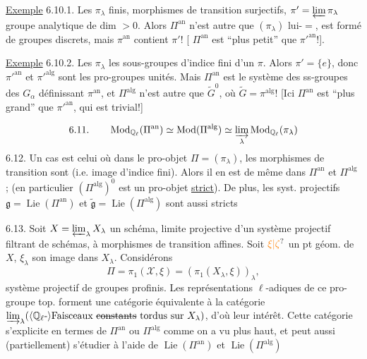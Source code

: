 \uline{Exemple} 6.10.1. Les $\pi_\lambda$ finis, morphismes de transition surjectifs, $\pi'=\varprojlim\pi_\lambda$ groupe analytique de dim $>0$. Alors $\Pi^{\mathrm{an}}$ n'est autre que $(\pi_\lambda)$ lui-$=$, est formé de groupes discrets, mais $\pi^{\mathrm{an}}$ contient  $\pi'$! [ $\Pi^{\mathrm{an}}$  est ``plus petit'' que $\pi'^{\mathrm{an}}$!].

\uline{Exemple} 6.10.2. Les $\pi_\lambda$ les sous-groupes d'indice fini d'un $\pi$. Alors $\pi'=\{e\}$, donc $\pi'^{\mathrm{an}}$ et $\pi'^{\mathrm{alg}}$ sont les pro-groupes unités. Mais $\Pi^{\mathrm{an}}$ est le système des ss-groupes  des $G_\alpha$ définissant $\pi^{\mathrm{an}}$, et $\Pi^{\mathrm{alg}}$ n'est autre que $\widetilde G^0$, où $\widetilde G=\pi^{\mathrm{alg}}$!  [Ici $\Pi^{\mathrm{an}}$ est ``plus grand'' que $\pi'^{\mathrm{an}}$, qui est trivial!]

\[
6.11.\qquad \operatorname{Mod}_{\mathbb{Q}_\ell}(\Pi^{\mathrm{an}})\simeq
\operatorname{Mod}(\Pi^{\mathrm{alg}})\simeq
\varinjlim_\lambda\operatorname{Mod}_{\mathbb{Q}_\ell}(\pi_\lambda)
\]
6.12. Un cas  est celui où dans le 
pro-objet $\Pi=(\pi_\lambda)$, les morphismes de transition sont
 (i.e. image d'indice fini). Alors il en est de même
dans $\Pi^{\mathrm{an}}$ et $\Pi^{\mathrm{alg}}$ ; (en particulier
$(\Pi^{\mathrm{alg}})^0$ est un pro-objet \uline{strict}). De plus, les syst.
projectifs $\mathfrak{g}=\operatorname{Lie}(\Pi^{\mathrm{an}})$ et
$\widetilde{\mathfrak{g}}=\operatorname{Lie}(\Pi^{\mathrm{alg}})$ sont aussi
stricts 

6.13. Soit $X=\varprojlim_\lambda X_\lambda$ un schéma, limite projective
d'un système projectif filtrant 
de schémas, à morphismes de transition affines. Soit $\unsure{\xi|\zeta}$ un pt géom.
de $X$, $\xi_\lambda$ son image dans $X_\lambda$. Considérons
\[
\Pi=\pi_1(\mathscr{X},\xi)=(\pi_1(X_\lambda,\xi))_\lambda,
\]
système projectif de groupes profinis. Les représentations
$\ell$-adiques de ce  pro-groupe top. forment une
catégorie équivalente à la catégorie
$\varinjlim_\lambda(\inserted{\mathbb{Q}_\ell\text{-}}\text{Faisceaux
\deleted{constants} tordus sur }X_\lambda)$, d'où leur intérêt. Cette
catégorie s'explicite en termes de $\Pi^{\mathrm{an}}$ ou $\Pi^{\mathrm{alg}}$
comme on a vu plus haut, et peut aussi (partiellement) s'étudier à l'aide
de $\operatorname{Lie}(\Pi^{\mathrm{an}})$ et
$\operatorname{Lie}(\Pi^{\mathrm{alg}})$

